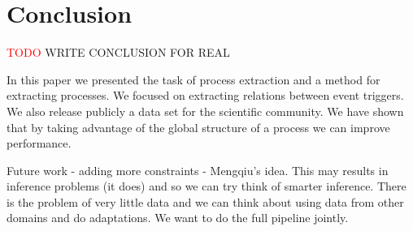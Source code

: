 \section{Conclusion}

\textcolor{red}{TODO} WRITE CONCLUSION FOR REAL

In this paper we presented the task of process extraction and a method for extracting processes. We focused on extracting relations between event triggers. We also release publicly a data set for the scientific community. We have shown that by taking advantage of the global structure of a process we can improve performance.

Future work - adding more constraints - Mengqiu's idea. This may results in inference problems (it does) and so we can try think of smarter inference. There is the problem of very little data and we can think about using data from other domains and do adaptations. We want to do the full pipeline jointly.
